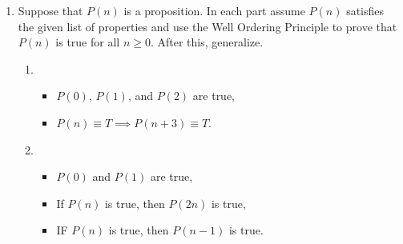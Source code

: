 \begin{enumerate}
\item Suppose that $P(n)$ is a proposition. In each part assume $P(n)$ satisfies the given list of properties and use the Well Ordering Principle to prove that $P(n)$ is true for all $n \geq 0$. After this, generalize.
	\begin{enumerate}
		\item 
		\begin{itemize}
			\item $P(0)$, $P(1)$, and $P(2)$ are true,
			\item $P(n) \equiv T \implies P(n + 3) \equiv T$.
		\end{itemize}
		\item
		\begin{itemize}
			\item $P(0)$ and $P(1)$ are true,
			\item If $P(n)$ is true, then $P(2n)$ is true,
			\item IF $P(n)$ is true, then $P(n - 1)$ is true.
		\end{itemize}
	\end{enumerate}
\end{enumerate}